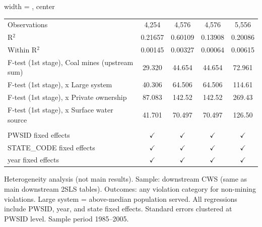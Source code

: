 \begin{table}[htbp]
\begin{adjustbox}{width = \textwidth, center}
\begin{tabular}{lcccc}
          \\
         
         Observations                                  & 4,254          & 4,576          & 4,576         & 5,556\\  
         R$^2$                                         & 0.21657        & 0.60109        & 0.13908       & 0.20086\\  
         Within R$^2$                                  & 0.00145        & 0.00327        & 0.00064       & 0.00615\\  
         F-test (1st stage), Coal mines (upstream sum) & 29.320         & 44.654         & 44.654        & 72.961\\  
         F-test (1st stage),   x Large system          & 40.306         & 64.506         & 64.506        & 114.61\\  
         F-test (1st stage),   x Private ownership     & 87.083         & 142.52         & 142.52        & 269.43\\  
         F-test (1st stage),   x Surface water source  & 41.701         & 70.497         & 70.497        & 126.50\\  
         
          \\
         
         PWSID fixed effects                           & $\checkmark$   & $\checkmark$   & $\checkmark$  & $\checkmark$\\   
         STATE\_CODE fixed effects                     & $\checkmark$   & $\checkmark$   & $\checkmark$  & $\checkmark$\\   
         year fixed effects                            & $\checkmark$   & $\checkmark$   & $\checkmark$  & $\checkmark$\\   
         
         \bottomrule
         
      \end{tabular}
      
      
      
   \end{adjustbox}
      {\tiny\linespread{1}\selectfont \par \raggedright 
   Heterogeneity analysis (not main results). Sample: downstream CWS (same as main downstream 2SLS tables). Outcomes: any violation category for non-mining violations. Large system = above-median population served. All regressions include PWSID, year, and state fixed effects. Standard errors clustered at PWSID level. Sample period 1985--2005.}
   
\end{table}


